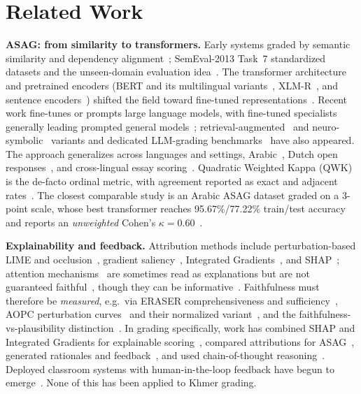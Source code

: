\documentclass[journal]{IEEEtran}
\begin{document}
\section{Related Work}
\textbf{ASAG: from similarity to transformers.} Early systems graded by semantic similarity and
dependency alignment~\cite{mohler2011}; SemEval-2013 Task~7 standardized datasets and the
unseen-domain evaluation idea~\cite{dzikovska2013}. The transformer
architecture~\cite{vaswani2017attention} and pretrained encoders (BERT and its multilingual
variants~\cite{devlin2019bert}, XLM-R~\cite{conneau2020xlmr}, and sentence
encoders~\cite{reimers2019sbert}) shifted the field toward fine-tuned
representations~\cite{sung2022survey,tan2025review}. Recent work fine-tunes or prompts large
language models, with fine-tuned specialists generally leading prompted general
models~\cite{chang2024gpt4,xu2025qwenscore}; retrieval-augmented~\cite{graderag2025} and
neuro-symbolic~\cite{neurosymbolic2024asag} variants and dedicated LLM-grading
benchmarks~\cite{sasbench2025} have also appeared. The approach generalizes across languages and
settings, Arabic~\cite{alqurashi2025arabic}, Dutch open responses~\cite{lachana2025dutch}, and
cross-lingual essay scoring~\cite{li2024crosslingual}. Quadratic Weighted Kappa
(QWK)~\cite{cohen1968qwk} is the de-facto ordinal metric, with agreement reported as exact and
adjacent rates~\cite{williamson2012framework}. The closest comparable study is an Arabic ASAG
dataset graded on a 3-point scale, whose best transformer reaches 95.67\%/77.22\% train/test
accuracy and reports an \emph{unweighted} Cohen's $\kappa=0.60$~\cite{alaoui2024}.

\textbf{Explainability and feedback.} Attribution methods include perturbation-based LIME and
occlusion~\cite{ribeiro2016lime}, gradient saliency~\cite{simonyan2014saliency,li2016visualizing},
Integrated Gradients~\cite{sundararajan2017ig}, and SHAP~\cite{lundberg2017shap}; attention
mechanisms~\cite{bahdanau2015attention} are sometimes read as explanations but are not guaranteed
faithful~\cite{jain2019attention}, though they can be informative~\cite{wiegreffe2019attention}.
Faithfulness must therefore be \emph{measured}, e.g.\ via ERASER comprehensiveness and
sufficiency~\cite{deyoung2020eraser}, AOPC perturbation curves~\cite{samek2017aopc} and their
normalized variant~\cite{naopc2024}, and the faithfulness-vs-plausibility
distinction~\cite{jacovi2020faithfulness,lyu2024faithfulsurvey}. In grading specifically, work has
combined SHAP and Integrated Gradients for explainable scoring~\cite{exasag2023}, compared
attributions for ASAG~\cite{pinto2025attribution}, generated rationales and
feedback~\cite{condor2024,kumar2020explainable,nam2024grading}, and used chain-of-thought
reasoning~\cite{wei2022cot}. Deployed classroom systems with human-in-the-loop feedback have begun
to emerge~\cite{engsaf2024,chillgrader2025}. None of this has been applied to Khmer grading.
\end{document}
